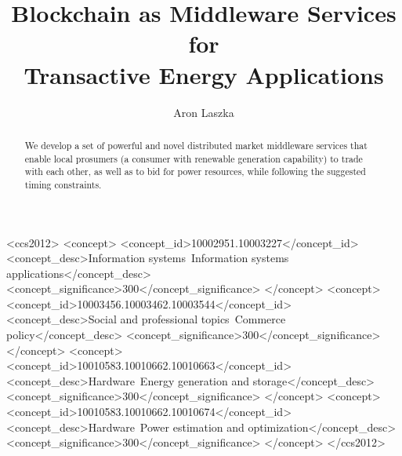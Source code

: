 \documentclass[sigconf]{acmart}
\begin{document}
\title[Blockchain as Middleware Services for Transactive Energy Applications]{Blockchain as Middleware Services for\\Transactive Energy Applications}

\author{Aron Laszka}

\renewcommand{\shortauthors}{A. Laszka et al.}

\begin{abstract}
We develop a set of powerful and novel distributed market middleware services that enable local prosumers (a consumer with renewable generation capability) to trade with each other, as well as to bid for power resources, while following the suggested timing constraints.
\end{abstract}

%
%
\begin{CCSXML}
<ccs2012>
<concept>
<concept_id>10002951.10003227</concept_id>
<concept_desc>Information systems~Information systems applications</concept_desc>
<concept_significance>300</concept_significance>
</concept>
<concept>
<concept_id>10003456.10003462.10003544</concept_id>
<concept_desc>Social and professional topics~Commerce policy</concept_desc>
<concept_significance>300</concept_significance>
</concept>
<concept>
<concept_id>10010583.10010662.10010663</concept_id>
<concept_desc>Hardware~Energy generation and storage</concept_desc>
<concept_significance>300</concept_significance>
</concept>
<concept>
<concept_id>10010583.10010662.10010674</concept_id>
<concept_desc>Hardware~Power estimation and optimization</concept_desc>
<concept_significance>300</concept_significance>
</concept>
</ccs2012>
\end{CCSXML}



\maketitle
\end{document}
